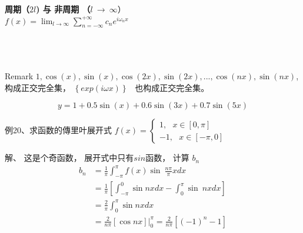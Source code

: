 \begin{frame}
	\textbf{{\large 周期（$2l$) 与 非周期 （$l~\to ~\infty $}}） \\
	{\large  $\displaystyle f(x) =\lim_{l\to \infty} \sum_{n=-\infty}^{+\infty}  c_n e^{i\omega_n x} $ }\\	
	\\	
	\\
	\\
	\begin{block} {Remark}
		$1, \cos(x), \sin (x), \cos(2x), \sin (2x), ..., \cos(nx), \sin (nx) $, 构成正交完全集，
		$\left\{  exp(i\omega x)  \right\}$  也构成正交完全集。\\
	\end{block}
\end{frame}

\begin{frame}
	\begin{equation*}
		y=1 + 0.5\sin(x)+0.6\sin(3x)+0.7\sin(5x)
	\end{equation*}    
\end{frame}

\begin{frame}
	\begin{exampleblock} {例20、求函数的傳里叶展开式}
	$\displaystyle f(x)=\begin{cases}
		1 , ~~~ x \in [0, \pi] \\
		-1 ,~~~ x \in [-\pi, 0] \
	\end{cases}$ \\
	\end{exampleblock}
	\alert{解、} 这是个奇函数， 展开式中只有$sin$函数， 计算 $b_n$\\
	\begin{align*}
		b_n &=\frac{1}{\pi}  \int_{-\pi}^{\pi}  f(x) \sin~ \frac{n\pi}{\pi} x dx  \\	
		&=\frac{1}{\pi}  [ \int_{-\pi}^{0}  \sin n x dx - \int_{0}^{\pi}  \sin~nx dx] \\
		&=\frac{2}{\pi}  \int_{0}^{\pi}  \sin nx dx  \\
		&=\frac{2}{n\pi} [\cos nx] |_0 ^\pi =\frac{2}{n\pi} [ (-1) ^n -1]
	\end{align*}
\end{frame}

